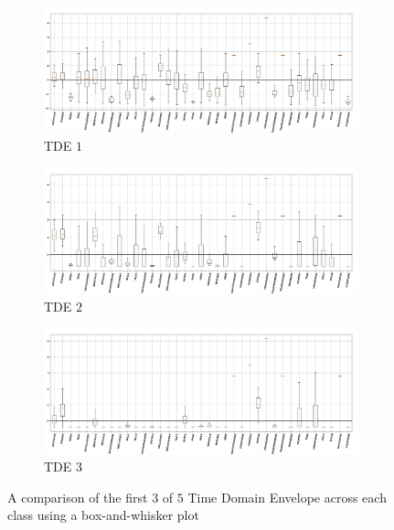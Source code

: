 \documentclass[12pt,letterpaper]{article}
\begin{document}
\begin{figure}[H]

	\begin{subfigure}{1.0\textwidth}
	\centering
	\includegraphics[width=\textwidth , height=0.2\textheight]
		{../FiguresFeatures/TDE_1}
	\caption{TDE $1$}
	\end{subfigure}
	
	\begin{subfigure}{1.0\textwidth}
	\centering
	\includegraphics[width=\textwidth , height=0.2\textheight]
		{../FiguresFeatures/TDE_2}
	\caption{TDE $2$}
	\end{subfigure}
	
	\begin{subfigure}{1.0\textwidth}
	\centering
	\includegraphics[width=\textwidth , height=0.2\textheight]
		{../FiguresFeatures/TDE_3}
	\caption{TDE $3$}
	\end{subfigure}
		
\caption{A comparison of the first $3$ of $5$ Time Domain Envelope across each class using a box-and-whisker plot}
\label{fig-FeatureTDE}
\end{figure}
\end{document}
